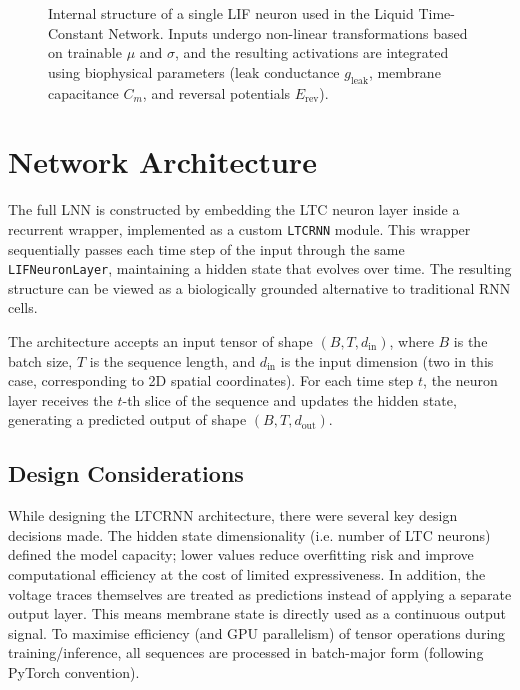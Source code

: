 \begin{figure}[H]
    \caption{Internal structure of a single LIF neuron used in the Liquid Time-Constant Network. Inputs undergo non-linear transformations based on trainable $\mu$ and $\sigma$, and the resulting activations are integrated using biophysical parameters (leak conductance $g_\text{leak}$, membrane capacitance $C_m$, and reversal potentials $E_\text{rev}$).}
    \label{fig:lif_neuron_detailed}
\end{figure}


\section{Network Architecture}
The full LNN is constructed by embedding the LTC neuron layer inside a recurrent wrapper, implemented as a custom \texttt{LTCRNN} module. This wrapper sequentially passes each time step of the input through the same \texttt{LIFNeuronLayer}, maintaining a hidden state that evolves over time. The resulting structure can be viewed as a biologically grounded alternative to traditional RNN cells.

The architecture accepts an input tensor of shape $(B, T, d_{\text{in}})$, where $B$ is the batch size, $T$ is the sequence length, and $d_{\text{in}}$ is the input dimension (two in this case, corresponding to 2D spatial coordinates). For each time step $t$, the neuron layer receives the $t$-th slice of the sequence and updates the hidden state, generating a predicted output of shape $(B, T, d_{\text{out}})$.

\subsection*{Design Considerations}
While designing the LTCRNN architecture, there were several key design decisions made. The hidden state dimensionality (i.e. number of LTC neurons) defined the model capacity; lower values reduce overfitting risk and improve computational efficiency at the cost of limited expressiveness. In addition, the voltage traces themselves are treated as predictions instead of applying a separate output layer. This means membrane state is directly used as a continuous output signal. To maximise efficiency (and GPU parallelism) of tensor operations during training/inference, all sequences are processed in batch-major form (following PyTorch convention).

